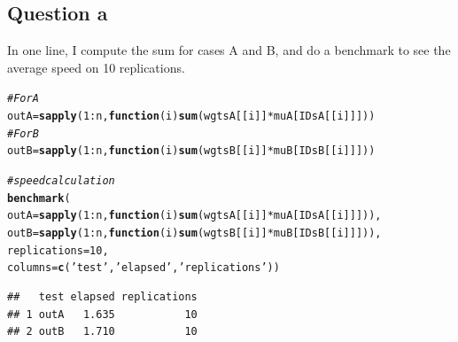 \documentclass{llncs}\usepackage[]{graphicx}\usepackage[]{color}
\makeatletter
\newcommand{\hlnum}[1]{\textcolor[rgb]{0.686,0.059,0.569}{#1}}%
\newcommand{\hlstr}[1]{\textcolor[rgb]{0.192,0.494,0.8}{#1}}%
\newcommand{\hlcom}[1]{\textcolor[rgb]{0.678,0.584,0.686}{\textit{#1}}}%
\newcommand{\hlopt}[1]{\textcolor[rgb]{0,0,0}{#1}}%
\newcommand{\hlstd}[1]{\textcolor[rgb]{0.345,0.345,0.345}{#1}}%
\newcommand{\hlkwa}[1]{\textcolor[rgb]{0.161,0.373,0.58}{\textbf{#1}}}%
\newcommand{\hlkwb}[1]{\textcolor[rgb]{0.69,0.353,0.396}{#1}}%
\newcommand{\hlkwc}[1]{\textcolor[rgb]{0.333,0.667,0.333}{#1}}%
\newcommand{\hlkwd}[1]{\textcolor[rgb]{0.737,0.353,0.396}{\textbf{#1}}}%
\newenvironment{kframe}{%
 \def\at@end@of@kframe{}%
 \ifinner\ifhmode%
  \def\at@end@of@kframe{\end{minipage}}%
  \begin{minipage}{\columnwidth}%
 \fi\fi%
 \def\FrameCommand##1{\hskip\@totalleftmargin \hskip-\fboxsep
 \colorbox{shadecolor}{##1}\hskip-\fboxsep
     \hskip-\linewidth \hskip-\@totalleftmargin \hskip\columnwidth}%
 \MakeFramed {\advance\hsize-\width
   \@totalleftmargin\z@ \linewidth\hsize
   \@setminipage}}%
 {\par\unskip\endMakeFramed%
 \at@end@of@kframe}
\newenvironment{knitrout}{}{} %
\makeatother
\begin{document}
\subsection{Question a}
In one line, I compute the sum for cases A and B, and do a benchmark to see the average speed on 10 replications.
\begin{knitrout}
\color{fgcolor}\begin{kframe}
\begin{alltt}
\hlcom{# For A}
\hlstd{outA} \hlkwb{=} \hlkwd{sapply}\hlstd{(}\hlnum{1}\hlopt{:}\hlstd{n,}\hlkwa{function}\hlstd{(}\hlkwc{i}\hlstd{)} \hlkwd{sum}\hlstd{(wgtsA[[i]]}\hlopt{*}\hlstd{muA[IDsA[[i]]]))}
\hlcom{# For B}
\hlstd{outB} \hlkwb{=} \hlkwd{sapply}\hlstd{(}\hlnum{1}\hlopt{:}\hlstd{n,}\hlkwa{function}\hlstd{(}\hlkwc{i}\hlstd{)} \hlkwd{sum}\hlstd{(wgtsB[[i]]}\hlopt{*}\hlstd{muB[IDsB[[i]]]))}

\hlcom{# speed calculation}
\hlkwd{benchmark}\hlstd{(}
  \hlkwc{outA}\hlstd{=}\hlkwd{sapply}\hlstd{(}\hlnum{1}\hlopt{:}\hlstd{n,}\hlkwa{function}\hlstd{(}\hlkwc{i}\hlstd{)} \hlkwd{sum}\hlstd{(wgtsA[[i]]}\hlopt{*}\hlstd{muA[IDsA[[i]]])),}
  \hlkwc{outB}\hlstd{=}\hlkwd{sapply}\hlstd{(}\hlnum{1}\hlopt{:}\hlstd{n,}\hlkwa{function}\hlstd{(}\hlkwc{i}\hlstd{)} \hlkwd{sum}\hlstd{(wgtsB[[i]]}\hlopt{*}\hlstd{muB[IDsB[[i]]])),}
  \hlkwc{replications} \hlstd{=} \hlnum{10}\hlstd{,}
  \hlkwc{columns}\hlstd{=}\hlkwd{c}\hlstd{(}\hlstr{'test'}\hlstd{,} \hlstr{'elapsed'}\hlstd{,} \hlstr{'replications'}\hlstd{))}
\end{alltt}
\begin{lstlisting}[basicstyle=\ttfamily,breaklines=true]
##   test elapsed replications
## 1 outA   1.635           10
## 2 outB   1.710           10
\end{lstlisting}
\end{kframe}
\end{knitrout}
\end{document}
